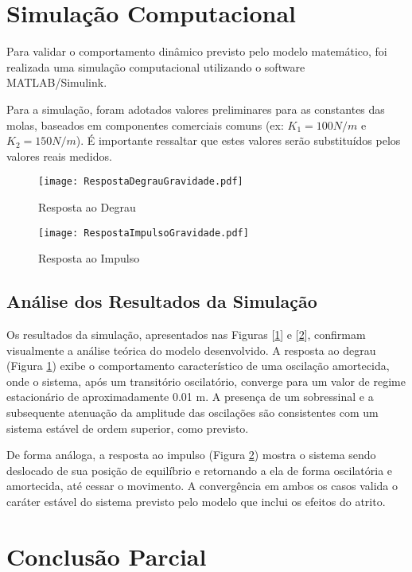\documentclass[9pt,a4paper,twocolumn,twoside]{tau-class/tau}
\begin{document}
\section{Simulação Computacional}

Para validar o comportamento dinâmico previsto pelo modelo matemático, foi realizada uma simulação computacional utilizando o software MATLAB/Simulink.

Para a simulação, foram adotados valores preliminares para as constantes das molas, baseados em componentes comerciais comuns (ex: $K_1 = 100N/m$ e $K_2 = 150N/m$). É importante ressaltar que estes valores serão substituídos pelos valores reais medidos.

\begin{figure}[H]
    \centering
    \texttt{[image: RespostaDegrauGravidade.pdf]}
    \caption{Resposta ao Degrau}
    \label{fig:RDG}
\end{figure}

\begin{figure}[H]
    \centering
    \texttt{[image: RespostaImpulsoGravidade.pdf]}
    \caption{Resposta ao Impulso}
    \label{fig:RIG}
\end{figure}


\subsection{Análise dos Resultados da Simulação}
Os resultados da simulação, apresentados nas Figuras [\ref{fig:RDG}] e [\ref{fig:RIG}], confirmam visualmente a análise teórica do modelo desenvolvido. A resposta ao degrau (Figura \ref{fig:RDG}) exibe o comportamento característico de uma oscilação amortecida, onde o sistema, após um transitório oscilatório, converge para um valor de regime estacionário de aproximadamente 0.01 m. A presença de um sobressinal e a subsequente atenuação da amplitude das oscilações são consistentes com um sistema estável de ordem superior, como previsto.

De forma análoga, a resposta ao impulso (Figura \ref{fig:RIG}) mostra o sistema sendo deslocado de sua posição de equilíbrio e retornando a ela de forma oscilatória e amortecida, até cessar o movimento. A convergência em ambos os casos valida o caráter estável do sistema previsto pelo modelo que inclui os efeitos do atrito.

\section{Conclusão Parcial}
\end{document}

